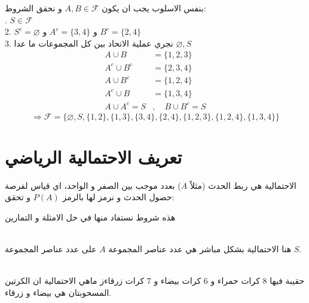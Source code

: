\begin{solution}
	بنفس الاسلوب يجب ان يكون \(A, B \in \mathcal{F}\) و نحقق الشروط:\\ . \(S \in \mathcal{F}\)\\
	2. \(S^c = \varnothing\) و \(A^c = \{3, 4\}\) و \(B^c = \{2, 4\}\)\\
	3. نجري عملية الاتحاد بين كل المجموعات ما عدا \(\varnothing, S\)
	\begin{align*}
		A \cup B &= \{1, 2, 3\} \\
		A^c \cup B^c &= \{2, 3, 4\} \\
		A \cup B^c &= \{1, 2, 4\} \\
		A^c \cup B &= \{1, 3, 4\} \\
		A \cup A^c = S &,\quad B \cup B^c = S
	\end{align*}
	\[
	\Rightarrow \mathcal{F} = \{\varnothing, S, \{1,2\}, \{1,3\},\{3,4\}, \{2,4\}, \{1,2,3\}, \{1,2,4\}, \{1,3,4\}\}
	\]
\end{solution}

\section{تعريف الاحتمالية الرياضي}

\begin{definition}
	الاحتمالية هي ربط الحدث (مثلاً \(A\)) بعدد موجب بين الصفر و الواحد، اي قياس لفرصة حصول الحدث و نرمز لها بالرمز \(P(A)\) و تحقق:
	\begin{flushleft}
	\end{flushleft}
	هذه شروط نستفاد منها في حل الامثلة و التمارين
\end{definition}

\begin{example}
	\\
	هنا الاحتمالية بشكل مباشر هي عدد عناصر المجموعة \(A\) على عدد عناصر المجموعة \(S\).
\end{example}

\begin{example}
	\\
	حقيبة فيها 8 كرات حمراء و 6 كرات بيضاء و 7 كرات زرقاءز ماهي الاحتمالية ان الكرتين المسحوبتان هي بيضاء و زرقاء. 
\end{example}

